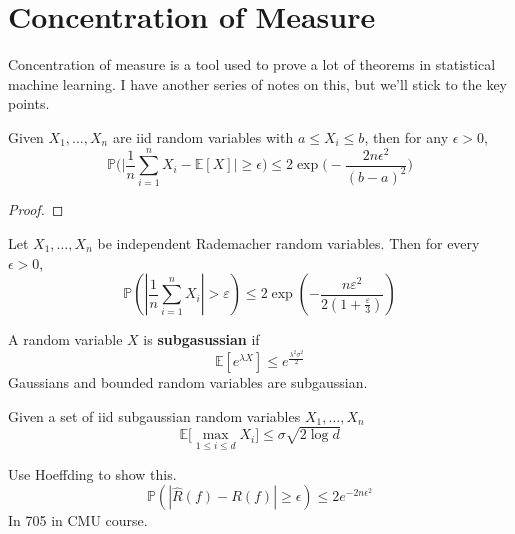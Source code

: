 \section{Concentration of Measure}

  Concentration of measure is a tool used to prove a lot of theorems in statistical machine learning. I have another series of notes on this, but we'll stick to the key points. 

  \begin{theorem}
    Given $X_1, \ldots, X_n$ are iid random variables with $a \leq X_i \leq b$, then for any $\epsilon > 0$, 
    \begin{equation}
      \mathbb{P} \bigg( \bigg| \frac{1}{n} \sum_{i=1}^n X_i - \mathbb{E}[X] \bigg| \geq \epsilon \bigg) \leq 2 \exp \bigg( - \frac{2 n \epsilon^2}{(b - a)^2} \bigg)
    \end{equation}
  \end{theorem}
  \begin{proof}
    
  \end{proof}

  \begin{theorem}
    Let $X_1, \ldots, X_n$ be independent Rademacher random variables. Then for every $\epsilon > 0$, 
    \begin{equation}
      \mathbb{P}\left(\left|\frac{1}{n}\sum_{i=1}^{n}X_i\right| > \varepsilon\right) \leq 2\exp\left(-\frac{n\varepsilon^2}{2(1+\frac{\varepsilon}{3})}\right)
    \end{equation} 
  \end{theorem}

  \begin{definition}
    A random variable $X$ is \textbf{subgasussian} if 
    \begin{equation}
      \mathbb{E}[e^{\lambda X}] \leq e^{\frac{\lambda^2 \sigma^2}{2}}
    \end{equation}
    Gaussians and bounded random variables are subgaussian.
  \end{definition}

  \begin{lemma}
    Given a set of iid subgaussian random variables $X_1, \ldots, X_n$ 
    \begin{equation}
      \mathbb{E}\big[ \max_{1 \leq i \leq d} X_i \big] \leq \sigma \sqrt{2 \log d}
    \end{equation}
  \end{lemma}


  Use Hoeffding to show this. 
  \begin{equation}
    \mathbb{P} (|\hat{R} (f) - R(f)| \geq \epsilon) \leq 2e^{- 2 n \epsilon^2}
  \end{equation}
  In 705 in CMU course. 

